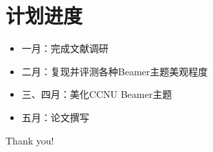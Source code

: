 \section{计划进度}
\begin{frame}
	\begin{itemize}
		\item 一月：完成文献调研
		\item 二月：复现并评测各种Beamer主题美观程度
		\item 三、四月：美化CCNU Beamer主题
		\item 五月：论文撰写
	\end{itemize}
\end{frame}


%     
%     


\begin{frame}
	\begin{center}
		{\Huge Thank you!}
	\end{center}
\end{frame}
